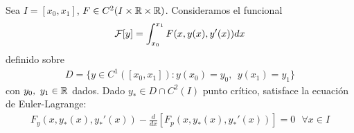 \begin{teo} %
    Sea $I=[x_0, x_1]$, $F\in C^2(I\times \mathbb{R} \times \mathbb{R})$. Consideramos el funcional
    \begin{gather*}
        \mathcal{F}[y] = \int_{x_0}^{x_1} F(x, y(x), y'(x)) dx
    \end{gather*}
    definido sobre
    \begin{gather*}
        D = \{y \in C^1([x_0, x_1]) : y(x_0) =y_0,\ \ y(x_1) = y_1\}
    \end{gather*}
    con $y_0,\ y_1\in \mathbb{R}$ dados. Dado $y_*\in D\cap C^2(I)$ punto crítico, satisface la ecuación de Euler-Lagrange:
    \begin{gather*}
        F_y(x, y_*(x), y_*'(x)) - \frac{d}{dx} [ F_p(x, y_*(x), y_*'(x))] = 0 \ \ \ \forall x \in I
    \end{gather*}


\end{teo}
